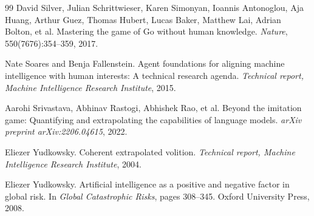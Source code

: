 \documentclass[11pt,letterpaper]{article}
\begin{document}
\begin{thebibliography}{99}
David Silver, Julian Schrittwieser, Karen Simonyan, Ioannis Antonoglou, Aja Huang, Arthur Guez, Thomas Hubert, Lucas Baker, Matthew Lai, Adrian Bolton, et al.
\newblock Mastering the game of Go without human knowledge.
\newblock \emph{Nature}, 550(7676):354--359, 2017.

Nate Soares and Benja Fallenstein.
\newblock Agent foundations for aligning machine intelligence with human interests: A technical research agenda.
\newblock \emph{Technical report, Machine Intelligence Research Institute}, 2015.

Aarohi Srivastava, Abhinav Rastogi, Abhishek Rao, et al.
\newblock Beyond the imitation game: Quantifying and extrapolating the capabilities of language models.
\newblock \emph{arXiv preprint arXiv:2206.04615}, 2022.

Eliezer Yudkowsky.
\newblock Coherent extrapolated volition.
\newblock \emph{Technical report, Machine Intelligence Research Institute}, 2004.

Eliezer Yudkowsky.
\newblock Artificial intelligence as a positive and negative factor in global risk.
\newblock In \emph{Global Catastrophic Risks}, pages 308--345. Oxford University Press, 2008.

\end{thebibliography}
\end{document}
